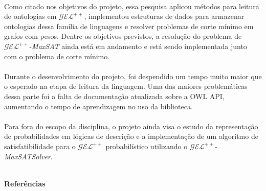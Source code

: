 \documentclass[portrait]{ppgcaposter}
\newcommand{\gelpp}{\mathcal{GEL}^{++}}
\begin{document}
\begin{multicols}{2}
    \paragraph{}
    Como citado nos objetivos do projeto, essa pesquisa aplicou métodos para leitura de ontologias em $\gelpp$, implementou estruturas de dados para armazenar ontologias dessa família de linguagens e resolver problemas de corte mínimo em grafos com pesos. Dentre os objetivos previstos, a resolução do problema de $\gelpp$-\emph{MaxSAT} ainda está em andamento e está sendo implementada junto com o problema de corte mínimo.
    \paragraph{}
    Durante o desenvolvimento do projeto, foi despendido um tempo muito maior que o esperado na etapa de leitura da linguagem. Uma das maiores problemáticas dessa parte foi a falta de documentação atualizada sobre a OWL API, aumentando o tempo de aprendizagem no uso da biblioteca.
    \paragraph{}
    Para fora do escopo da disciplina, o projeto ainda visa o estudo da representação de probabilidades em lógicas de descrição e a implementação de um algoritmo de satisfatibilidade para o $\gelpp$ probabilístico utilizando o $\gelpp$-\emph{MaxSATSolver}.
    \\
    \\
    \begin{mdframed}[style=MyFrame]
        \begin{center}
            \huge  \textbf{Referências\vphantom{ç}}
        \end{center}
    \end{mdframed}
    \paragraph*{}
    
\end{multicols}
\end{document}
